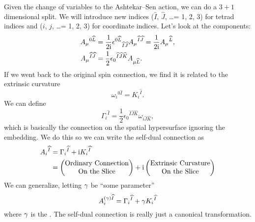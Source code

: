 Given the change of variables to the Ashtekar--Sen action, we can do a
$3+1$ dimensional split. We will introduce new indices ($\widehat{I}$,
$\widehat{J}$, \dots = 1, 2, 3) for tetrad indices and ($i$, $j$, \dots =
1, 2, 3) for coordinate indices. Let's look at the components:
\begin{subequations}
\begin{align}
{A_{\mu}}^{0\widehat{L}} &= \frac{1}{2\mathrm{i}}{\epsilon^{0\widehat{L}}}_{\widehat{I}\widehat{J}}{A_{\mu}}^{\widehat{I}\widehat{J}}=\frac{1}{2\mathrm{i}}{A_{\mu}}^{\widehat{L}},\\
{A_{\mu}}^{\widehat{I}\widehat{J}} &= \frac{1}{2}{\epsilon_{0}}^{\widehat{I}\widehat{J}\widehat{K}}A_{\mu\widehat{L}}.
\end{align}
\end{subequations}
If we went back to the original spin connection, we find it is related
to the extrinsic curvature
\begin{equation}
{\omega_{i}}^{0\widehat{I}} = {K_{i}}^{\widehat{I}}.
\end{equation}
We can define
\begin{equation}
{\Gamma_{i}}^{\widehat{I}} = \frac{1}{2}{\epsilon_{0}}^{\widehat{I}\widehat{J}\widehat{K}}\omega_{i\widehat{J}\widehat{K}},
\end{equation}
which is basically the connection on the spatial hypersurface ignoring
the embedding. We do this so we can write the self-dual connection as
\begin{align}
{A_{i}}^{\widehat{I}} &= {\Gamma_{i}}^{\widehat{I}} + \mathrm{i}{K_{i}}^{\widehat{I}} \\
&= \begin{pmatrix}\mbox{Ordinary Connection}\\
\mbox{On the Slice}\end{pmatrix} + \mathrm{i}\begin{pmatrix}\mbox{Extrinsic Curvature}\\
\mbox{On the Slice}\end{pmatrix}\nonumber
\end{align}
We can generalize, letting $\gamma$ be ``some parameter''
\begin{equation}
A^{(\gamma)\widehat{I}}_{i} =  {\Gamma_{i}}^{\widehat{I}} + \gamma{K_{i}}^{\widehat{I}}
\end{equation}
where $\gamma$ is the . The
self-dual connection is really just a canonical transformation.
